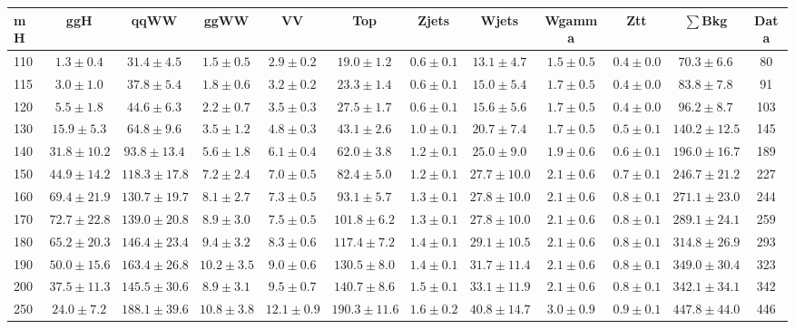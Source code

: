 \begin{table}[!ht]
{%
 \tiny
 \begin{center}
 \begin{tabular}{l c c c c c c c c c c c }
 \hline
 mH & ggH & qqWW & ggWW & VV & Top & Zjets & Wjets & Wgamma & Ztt & $\sum$Bkg & Data \\
 \hline
110 & $1.3\pm0.4$ & $31.4\pm4.5$ & $1.5\pm0.5$ & $2.9\pm0.2$ & $19.0\pm1.2$ & $0.6\pm0.1$ & $13.1\pm4.7$ & $1.5\pm0.5$ & $0.4\pm0.0$ & $70.3\pm6.6$ & 80 \\
115 & $3.0\pm1.0$ & $37.8\pm5.4$ & $1.8\pm0.6$ & $3.2\pm0.2$ & $23.3\pm1.4$ & $0.6\pm0.1$ & $15.0\pm5.4$ & $1.7\pm0.5$ & $0.4\pm0.0$ & $83.8\pm7.8$ & 91 \\
120 & $5.5\pm1.8$ & $44.6\pm6.3$ & $2.2\pm0.7$ & $3.5\pm0.3$ & $27.5\pm1.7$ & $0.6\pm0.1$ & $15.6\pm5.6$ & $1.7\pm0.5$ & $0.4\pm0.0$ & $96.2\pm8.7$ & 103 \\
130 & $15.9\pm5.3$ & $64.8\pm9.6$ & $3.5\pm1.2$ & $4.8\pm0.3$ & $43.1\pm2.6$ & $1.0\pm0.1$ & $20.7\pm7.4$ & $1.7\pm0.5$ & $0.5\pm0.1$ & $140.2\pm12.5$ & 145 \\
140 & $31.8\pm10.2$ & $93.8\pm13.4$ & $5.6\pm1.8$ & $6.1\pm0.4$ & $62.0\pm3.8$ & $1.2\pm0.1$ & $25.0\pm9.0$ & $1.9\pm0.6$ & $0.6\pm0.1$ & $196.0\pm16.7$ & 189 \\
150 & $44.9\pm14.2$ & $118.3\pm17.8$ & $7.2\pm2.4$ & $7.0\pm0.5$ & $82.4\pm5.0$ & $1.2\pm0.1$ & $27.7\pm10.0$ & $2.1\pm0.6$ & $0.7\pm0.1$ & $246.7\pm21.2$ & 227 \\
160 & $69.4\pm21.9$ & $130.7\pm19.7$ & $8.1\pm2.7$ & $7.3\pm0.5$ & $93.1\pm5.7$ & $1.3\pm0.1$ & $27.8\pm10.0$ & $2.1\pm0.6$ & $0.8\pm0.1$ & $271.1\pm23.0$ & 244 \\
170 & $72.7\pm22.8$ & $139.0\pm20.8$ & $8.9\pm3.0$ & $7.5\pm0.5$ & $101.8\pm6.2$ & $1.3\pm0.1$ & $27.8\pm10.0$ & $2.1\pm0.6$ & $0.8\pm0.1$ & $289.1\pm24.1$ & 259 \\
180 & $65.2\pm20.3$ & $146.4\pm23.4$ & $9.4\pm3.2$ & $8.3\pm0.6$ & $117.4\pm7.2$ & $1.4\pm0.1$ & $29.1\pm10.5$ & $2.1\pm0.6$ & $0.8\pm0.1$ & $314.8\pm26.9$ & 293 \\
190 & $50.0\pm15.6$ & $163.4\pm26.8$ & $10.2\pm3.5$ & $9.0\pm0.6$ & $130.5\pm8.0$ & $1.4\pm0.1$ & $31.7\pm11.4$ & $2.1\pm0.6$ & $0.8\pm0.1$ & $349.0\pm30.4$ & 323 \\
200 & $37.5\pm11.3$ & $145.5\pm30.6$ & $8.9\pm3.1$ & $9.5\pm0.7$ & $140.7\pm8.6$ & $1.5\pm0.1$ & $33.1\pm11.9$ & $2.1\pm0.6$ & $0.8\pm0.1$ & $342.1\pm34.1$ & 342 \\
250 & $24.0\pm7.2$ & $188.1\pm39.6$ & $10.8\pm3.8$ & $12.1\pm0.9$ & $190.3\pm11.6$ & $1.6\pm0.2$ & $40.8\pm14.7$ & $3.0\pm0.9$ & $0.9\pm0.1$ & $447.8\pm44.0$ & 446 \\

\end{tabular}
\end{center}}
\end{table}
